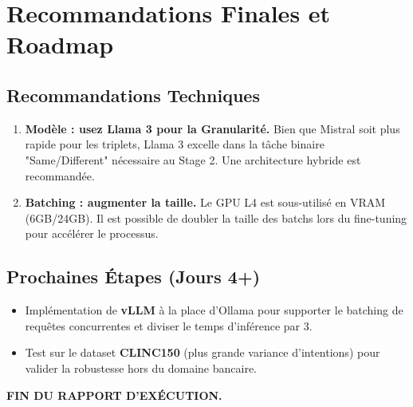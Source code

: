 \documentclass[11pt, a4paper]{article}
\begin{document}
\section{Recommandations Finales et Roadmap}

\subsection{Recommandations Techniques}
\begin{enumerate}
    \item \textbf{Modèle : usez Llama 3 pour la Granularité.} Bien que Mistral soit plus rapide pour les triplets, Llama 3 excelle dans la tâche binaire "Same/Different" nécessaire au Stage 2. Une architecture hybride est recommandée.
    \item \textbf{Batching : augmenter la taille.} Le GPU L4 est sous-utilisé en VRAM (6GB/24GB). Il est possible de doubler la taille des batchs lors du fine-tuning pour accélérer le processus.
\end{enumerate}

\subsection{Prochaines Étapes (Jours 4+)}
\begin{itemize}
    \item Implémentation de \textbf{vLLM} à la place d'Ollama pour supporter le batching de requêtes concurrentes et diviser le temps d'inférence par 3.
    \item Test sur le dataset \textbf{CLINC150} (plus grande variance d'intentions) pour valider la robustesse hors du domaine bancaire.
\end{itemize}

\vspace{1cm}
\begin{center}
    \textbf{FIN DU RAPPORT D'EXÉCUTION.}
\end{center}
\end{document}
